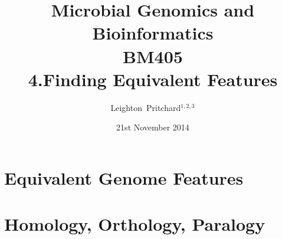 

%



\title[Microbial Genomics and Bioinformatics: 4.Equivalent Features] %
{Microbial Genomics and \\ Bioinformatics \\
BM405 \\
4.Finding Equivalent Features}
\author[Pritchard] %
{Leighton~Pritchard$^{1,2,3}$}
\date[21st November 2014] %
{21st November 2014}
\subject{Bioinformatics, Genomics, Bacteria, Sequencing, Microbiology, Microbes}





\frame[plain]{\titlepage}



\section{Equivalent Genome Features}


\section{Homology, Orthology, Paralogy}
%
%
%

